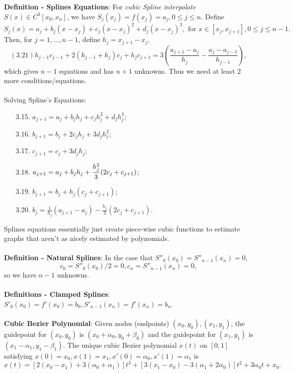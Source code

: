 \documentclass{article}
\begin{document}
\textbf{Definition - Splines Equations}: For \textit{cubic Spline interpolate} $S(x) \in C^3[x_0, x_n]$, we have $S_j(x_j) = f(x_j) = a_j, 0 \leq j \leq n$. Define $$S_j(x) = a_j + b_j(x - x_j ) + c_j(x - x_j)^2 + d_j(x - x_j)^3, \text{ for } x \in [x_j, x_{j + 1}], 0 \leq j \leq n - 1.$$ Then, for $j = 1, \dots, n - 1$, define $h_j = x_{j + 1} - x_j$, $$(3.21) h_{j - 1} c_{j - 1} + 2(h_{j - 1} + h_j)c_j + h_j c_{j + 1} = 3\left(\frac{a_{j + 1} - a_j}{h_j} - \frac{a_j - a_{j - 1}}{h_{j - 1}}\right),$$ which gives $n - 1$ equations and has $n + 1$ unknowns. Thus we need at least 2 more conditions/equations. \\ \\
Solving Spline's Equations: \begin{enumerate}
    \item[3.15.] $a_{j + 1} = a_j + b_j h_j + c_j h_j^2 + d_j h_j^3$;
    \item[3.16.] $b_{j + 1} = b_j + 2c_j h_j + 3d_j h_j^2$;
    \item[3.17.] $c_{j + 1} = c_j + 3d_j h_j$;
    \item[3.18.] $a_{j + 1} = a_j + b_j h_j + \mathlarger{\frac{h_j^2}{3}} (2c_j + c_{j + 1})$;
    \item[3.19.] $b_{j + 1} = b_j + h_j(c_j + c_{j + 1})$;
    \item[3.20.] $b_{j} = \frac{1}{h_j} (a_{j + 1} - a_j) - \frac{h_j}{3} (2c_j + c_{j + 1}).$
\end{enumerate} $ $ \\
Splines equations essentially just create piece-wise cubic functions to estimate graphs that aren't as nicely estimated by polynomials. \\ \\
\textbf{Definition - Natural Splines}: In the case that $S''_0(x_0) = S''_{n - 1}(x_n) = 0$, $$c_0 = S''_0(x_0)/2 = 0, c_n = S''_{n - 1}(x_n) = 0,$$ so we have $n - 1$ unknowns. \\ \\
\textbf{Definitions - Clamped Splines}: $S'_0(x_0) = f'(x_0) = b_0, S'_{n - 1}(x_n) = f'(x_n) = b_n$. \\ \\
\textbf{Cubic Bezier Polynomial}: Given nodes (endpoints) $(x_0, y_0), (x_1, y_1)$, the guidepoint for $(x_0, y_0)$ is $(x_0 + \alpha_0, y_0 + \beta_0)$ and the guidepoint for $(x_1, y_1)$ is $(x_1 - \alpha_1, y_1 - \beta_1)$. The unique cubic Bezier polynomial $x(t)$ on $[0, 1]$ satisfying $x(0) = x_0, x(1) = x_1, x'(0) = \alpha_0, x'(1) = \alpha_1$ is $$x(t) = [2(x_0 - x_1) + 3(\alpha_0 + \alpha_1)]t^3 + [3(x_1 - x_0) - 3(\alpha_1 + 2\alpha_0)]t^2 + 3\alpha_0 t + x_0.$$
\end{document}
